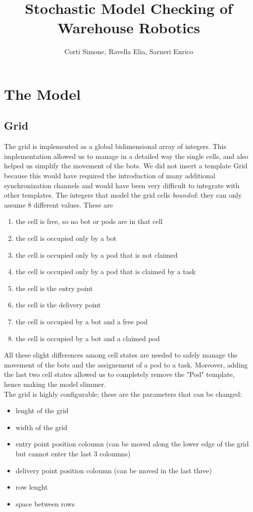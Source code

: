 \documentclass[10pt,a4paper]{article}
\title{Stochastic Model Checking of Warehouse Robotics}
\author{Corti Simone, Ravella Elia, Sarneri Enrico}
\begin{document}
	\begin{titlepage}
		\maketitle
	\end{titlepage}
	
	\tableofcontents
	\clearpage
	
	\section{The Model}
		\subsection{Grid}
			The grid is implemented as a global bidimensional array of integers. This implementation allowed us to manage in a detailed way the single cells, and also helped us simplify the movement of the bots. We did not insert a template Grid because this would have required the introduction of many additional synchronization channels and would have been very difficult to integrate with other templates.
			The integers that model the grid cells \emph{bounded}: they can only assume 8 different values. These are
			\begin{enumerate}[start=0, label={\arabic* :}]
				\item the cell is free, so no bot or pods are in that cell
				\item the cell is occupied only by a bot
				\item the cell is occupied only by a pod that is not claimed
				\item the cell is occupied only by a pod that is claimed by a task 
				\item the cell is the entry point 
				\item the cell is the delivery point
				\item the cell is occupied by a bot and a free pod
				\item the cell is occupied by a bot and a claimed pod
			\end{enumerate}
			All these slight differences among cell states are needed to safely manage the movement of the bots and the assignement of a pod to a task. Moreover, adding the last two cell states allowed us to completely remove the "Pod" template, hence making the model slimmer.\\
			The grid is highly configurable; these are the parameters that can be changed:
			\begin{itemize}
				\item lenght of the grid
				\item width of the grid
				\item entry point position coloumn (can be moved along the lower edge of the grid but cannot enter the last 3 coloumns) 
				\item delivery point position coloumn (can be moved in the last three)
				\item row lenght
				\item space between rows
			\end{itemize}
\end{document}
